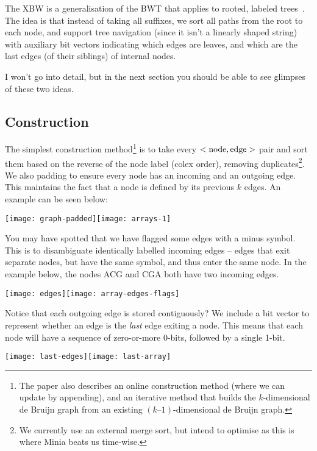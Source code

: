 The XBW is a generalisation of the BWT that applies to rooted, labeled trees~\cite{FLMM09}. The idea is that instead of taking all suffixes, we sort all paths from the root to each node, and support tree navigation (since it isn't a linearly shaped string) with auxiliary bit vectors indicating which edges are leaves, and which are the last edges (of their siblings) of internal nodes.

I won't go into detail, but in the next section you should be able to see glimpses of these two ideas.

\subsection{Construction}\label{bl-sec:con}

The simplest construction method\footnote{The paper also describes an online construction method (where we can update by appending), and an iterative method that builds the $k$-dimensional de Bruijn graph from an existing $(k–1)$-dimensional de Bruijn graph.} is to take every $<\rm node, edge>$ pair and sort them based on the reverse of the node label (colex order), removing duplicates\footnote{We currently use an external merge sort, but intend to optimise as this is where Minia beats us time-wise.}. We also padding to ensure every node has an incoming and an outgoing edge. This maintains the fact that a node is defined by its previous $k$ edges. An example can be seen below:

\medskip\centerline{\texttt{[image: graph-padded]}\hfill\texttt{[image: arrays-1]}}\medskip
 
You may have spotted that we have flagged some edges with a minus symbol. This is to disambiguate identically labelled incoming edges -- edges that exit separate nodes, but have the same symbol, and thus enter the same node. In the example below, the nodes ACG and CGA both have two incoming edges.

\medskip\centerline{\texttt{[image: edges]}\hfill\texttt{[image: array-edges-flags]}}\medskip
 
Notice that each outgoing edge is stored contiguously? We include a bit vector to represent whether an edge is the \emph{last} edge exiting a node. This means that each node will have a sequence of zero-or-more 0-bits, followed by a single 1-bit.

\medskip\centerline{\texttt{[image: last-edges]}\hfill\texttt{[image: last-array]}}\medskip
 
